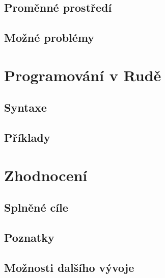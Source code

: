 \documentclass[12pt, a4paper,
twoside,        %
openright
]{report}
\let\oldchapter\chapter
\renewcommand{\chapter}{
	\clearpage
	\pagestyle{fancy}
	\oldchapter
}
\begin{document}
\section{Proměnné prostředí}

\section{Možné problémy}

\chapter{Programování v Rudě}

\section{Syntaxe}

\section{Příklady}

\chapter{Zhodnocení}

\section{Splněné cíle}

\section{Poznatky}

\section{Možnosti dalšího vývoje}
\end{document}
